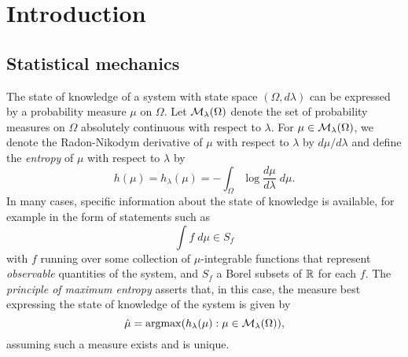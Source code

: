 
\chapter{Introduction}


\section{Statistical mechanics}

The state of knowledge of a system with state space $(\Omega, d\lambda)$ can be
expressed by a probability measure $\mu$ on $\Omega$. Let $\mathcal{M}_\lambda(\Omega)$ denote
the set of probability measures on $\Omega$ absolutely continuous with respect to $\lambda$.
For $\mu \in \mathcal{M}_\lambda(\Omega)$, we denote the Radon-Nikodym derivative of $\mu$ with
respect to $\lambda$ by $d\mu/d\lambda$ and define the \emph{entropy} of $\mu$ with respect
to $\lambda$ by
\begin{equation}
h(\mu) = h_\lambda(\mu) = -\int_\Omega \log\frac{d\mu}{d\lambda} \; d\mu.
\end{equation}
In many cases, specific information about
the state of knowledge is available, for example in the form of statements such as
\begin{equation}
\int f \; d\mu \in S_f
\end{equation}
with $f$ running over some collection of $\mu$-integrable functions
that represent \emph{observable} quantities of the system, and $S_f$ a Borel
subsets of ${\mathbb R}$ for each $f$. The \emph{principle of maximum entropy} asserts that, in this
case, the measure best expressing the state of knowledge of the system is given by
\begin{equation}
\hat\mu = \operatorname*{argmax}(h_\lambda(\mu) : \mu \in \mathcal{M}_\lambda(\Omega)),
\end{equation}
assuming such a measure exists and is unique.


